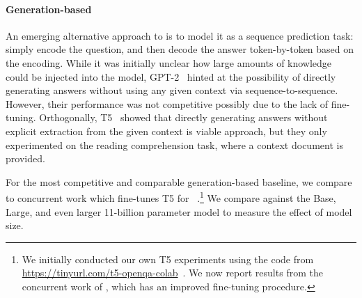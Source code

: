 \documentclass{article}
\begin{document}
\paragraph{Generation-based \openqa}
An emerging alternative approach to \openqa is to model it as a sequence prediction task:
simply encode the question, and then decode the answer token-by-token based on the encoding.
While it was initially unclear how large amounts of knowledge could be injected into the model,
GPT-2~\cite{gpt2} hinted at the possibility of directly generating answers without using any given context via sequence-to-sequence. However, their performance was not competitive possibly due to the lack of fine-tuning. Orthogonally, T5~\cite{t5} showed that directly generating answers without explicit extraction from the given context is viable approach, but they only experimented on the reading comprehension task, where a context document is provided.




For the most competitive and comparable generation-based baseline, we compare to concurrent work which fine-tunes T5 for \openqa~\cite{t5_openqa}.\footnote{We initially conducted our own T5 experiments using the code from {\tiny\url{https://tinyurl.com/t5-openqa-colab}}~\cite{t5}. We now report results from the concurrent work of \citet{t5_openqa}, which has an improved fine-tuning procedure.}
We compare against the Base, Large, and even larger 11-billion parameter model to measure the effect of model size.
\end{document}
